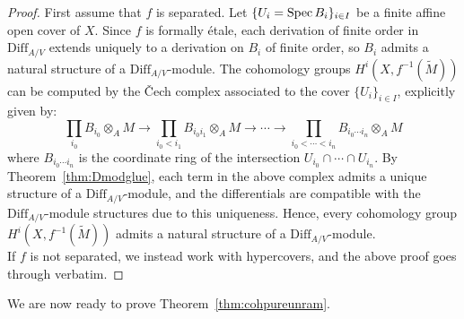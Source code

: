 \begin{proof}
First assume that $f$ is separated. Let $\{U_i=\operatorname{Spec}{B_i}\}_{i \in I}$ be a finite affine open cover of $X$. 
Since $f$ is formally \'{e}tale, each derivation of finite order in $\mathrm{Diff}_{A/V}$ extends uniquely to a derivation on $B_i$ of finite order, 
so $B_i$ admits a natural structure of a $\mathrm{Diff}_{A/V}$-module. The cohomology groups $H^i(X, f^{-1}(\widetilde{M}))$ can be computed by the \v{C}ech complex associated to the cover $\{U_i\}_{i \in I}$,
explicitly given by:
\[ \prod_{i_0} B_{i_0} \otimes_A M \to \prod_{i_0 < i_1} B_{i_0 i_1} \otimes_A M \to \cdots \to \prod_{i_0 < \cdots < i_n} B_{i_0 \cdots i_n} \otimes_A M\]
where $B_{i_0 \cdots i_n}$ is the coordinate ring of the intersection $U_{i_0} \cap \cdots \cap U_{i_n}$. 
By Theorem~\ref{thm:Dmodglue}, each term in the above complex admits a unique structure of a $\mathrm{Diff}_{A/V}$-module, and the differentials are compatible with the $\mathrm{Diff}_{A/V}$-module structures due to this uniqueness.
Hence, every cohomology group $H^i(X, f^{-1}(\widetilde{M}))$ admits a natural structure of a $\mathrm{Diff}_{A/V}$-module.\\
\indent If $f$ is not separated, we instead work with hypercovers, and the above proof goes through verbatim.
\end{proof}
We are now ready to prove Theorem~\ref{thm:cohpureunram}.
